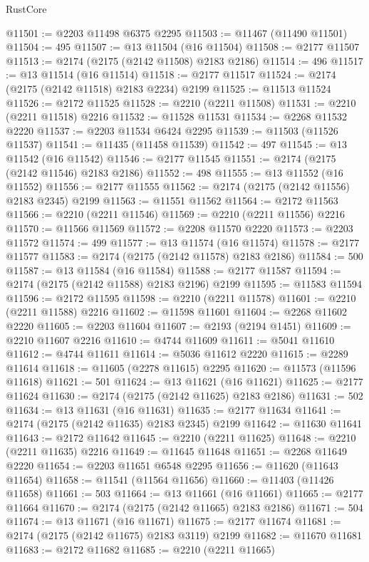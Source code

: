 \begin{lexlean}{RustCore}
\begin{coremodule}
@11501 := @2203 @11498 @6375 @2295
@11503 := @11467 (@11490 @11501)
@11504 := 495
@11507 := @13 @11504 (@16 @11504)
@11508 := @2177 @11507
@11513 := @2174 (@2175 (@2142 @11508) @2183 @2186)
@11514 := 496
@11517 := @13 @11514 (@16 @11514)
@11518 := @2177 @11517
@11524 := @2174 (@2175 (@2142 @11518) @2183 @2234) @2199
@11525 := @11513 @11524
@11526 := @2172 @11525
@11528 := @2210 (@2211 @11508)
@11531 := @2210 (@2211 @11518) @2216
@11532 := @11528 @11531
@11534 := @2268 @11532 @2220
@11537 := @2203 @11534 @6424 @2295
@11539 := @11503 (@11526 @11537)
@11541 := @11435 (@11458 @11539)
@11542 := 497
@11545 := @13 @11542 (@16 @11542)
@11546 := @2177 @11545
@11551 := @2174 (@2175 (@2142 @11546) @2183 @2186)
@11552 := 498
@11555 := @13 @11552 (@16 @11552)
@11556 := @2177 @11555
@11562 := @2174 (@2175 (@2142 @11556) @2183 @2345) @2199
@11563 := @11551 @11562
@11564 := @2172 @11563
@11566 := @2210 (@2211 @11546)
@11569 := @2210 (@2211 @11556) @2216
@11570 := @11566 @11569
@11572 := @2208 @11570 @2220
@11573 := @2203 @11572
@11574 := 499
@11577 := @13 @11574 (@16 @11574)
@11578 := @2177 @11577
@11583 := @2174 (@2175 (@2142 @11578) @2183 @2186)
@11584 := 500
@11587 := @13 @11584 (@16 @11584)
@11588 := @2177 @11587
@11594 := @2174 (@2175 (@2142 @11588) @2183 @2196) @2199
@11595 := @11583 @11594
@11596 := @2172 @11595
@11598 := @2210 (@2211 @11578)
@11601 := @2210 (@2211 @11588) @2216
@11602 := @11598 @11601
@11604 := @2268 @11602 @2220
@11605 := @2203 @11604
@11607 := @2193 (@2194 @1451)
@11609 := @2210 @11607 @2216
@11610 := @4744 @11609
@11611 := @5041 @11610
@11612 := @4744 @11611
@11614 := @5036 @11612 @2220
@11615 := @2289 @11614
@11618 := @11605 (@2278 @11615) @2295
@11620 := @11573 (@11596 @11618)
@11621 := 501
@11624 := @13 @11621 (@16 @11621)
@11625 := @2177 @11624
@11630 := @2174 (@2175 (@2142 @11625) @2183 @2186)
@11631 := 502
@11634 := @13 @11631 (@16 @11631)
@11635 := @2177 @11634
@11641 := @2174 (@2175 (@2142 @11635) @2183 @2345) @2199
@11642 := @11630 @11641
@11643 := @2172 @11642
@11645 := @2210 (@2211 @11625)
@11648 := @2210 (@2211 @11635) @2216
@11649 := @11645 @11648
@11651 := @2268 @11649 @2220
@11654 := @2203 @11651 @6548 @2295
@11656 := @11620 (@11643 @11654)
@11658 := @11541 (@11564 @11656)
@11660 := @11403 (@11426 @11658)
@11661 := 503
@11664 := @13 @11661 (@16 @11661)
@11665 := @2177 @11664
@11670 := @2174 (@2175 (@2142 @11665) @2183 @2186)
@11671 := 504
@11674 := @13 @11671 (@16 @11671)
@11675 := @2177 @11674
@11681 := @2174 (@2175 (@2142 @11675) @2183 @3119) @2199
@11682 := @11670 @11681
@11683 := @2172 @11682
@11685 := @2210 (@2211 @11665)

\end{coremodule}
\end{lexlean}
